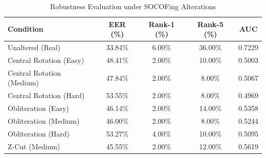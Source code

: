 \begin{table}[t]
\centering
\caption{Robustness Evaluation under SOCOFing Alterations}
\label{tab:alteration}
\begin{tabular}{lcccc}
\hline
Condition & EER (\%) & Rank-1 (\%) & Rank-5 (\%) & AUC \\
\hline
Unaltered (Real) & 33.84\% & 6.00\% & 36.00\% & 0.7229 \\
Central Rotation (Easy) & 48.41\% & 2.00\% & 10.00\% & 0.5003 \\
Central Rotation (Medium) & 47.84\% & 2.00\% & 8.00\% & 0.5067 \\
Central Rotation (Hard) & 53.55\% & 2.00\% & 8.00\% & 0.4969 \\
Obliteration (Easy) & 46.14\% & 2.00\% & 14.00\% & 0.5358 \\
Obliteration (Medium) & 46.00\% & 2.00\% & 8.00\% & 0.5244 \\
Obliteration (Hard) & 53.27\% & 4.00\% & 10.00\% & 0.5095 \\
Z-Cut (Medium) & 45.55\% & 2.00\% & 12.00\% & 0.5619 \\
\hline
\end{tabular}
\end{table}
